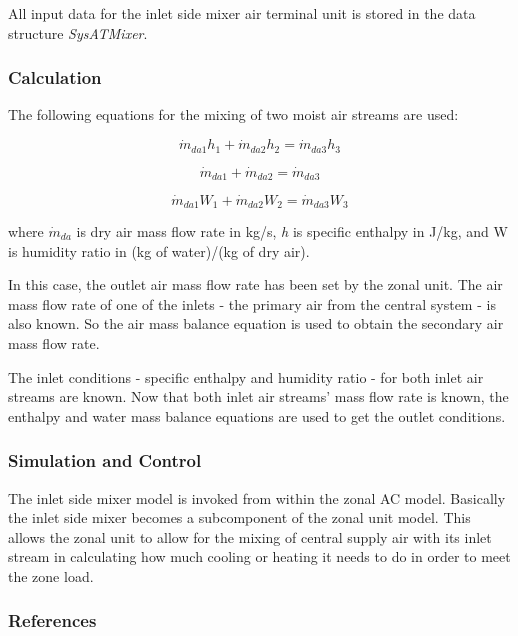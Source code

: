 All input data for the inlet side mixer air terminal unit is stored in the data structure \emph{SysATMixer}.

\subsubsection{Calculation}\label{calculation-1-000}

The following equations for the mixing of two moist air streams are used:

\begin{equation}
{\dot m_{da1}}{h_1} + {\dot m_{da2}}{h_2} = {\dot m_{da3}}{h_3}
\end{equation}

\begin{equation}
{\dot m_{da1}} + {\dot m_{da2}} = {\dot m_{da3}}
\end{equation}

\begin{equation}
{\dot m_{da1}}{W_1} + {\dot m_{da2}}{W_2} = {\dot m_{da3}}{W_3}
\end{equation}

where \({\dot m_{da}}\) is dry air mass flow rate in kg/s, \emph{h} is specific enthalpy in J/kg, and W is humidity ratio in (kg of water)/(kg of dry air).

In this case, the outlet air mass flow rate has been set by the zonal unit. The air mass flow rate of one of the inlets - the primary air from the central system - is also known. So the air mass balance equation is used to obtain the secondary air mass flow rate.

The inlet conditions - specific enthalpy and humidity ratio - for both inlet air streams are known. Now that both inlet air streams' mass flow rate is known, the enthalpy and water mass balance equations are used to get the outlet conditions.

\subsubsection{Simulation and Control}\label{simulation-and-control-1-002}

The inlet side mixer model is invoked from within the zonal AC model. Basically the inlet side mixer becomes a subcomponent of the zonal unit model. This allows the zonal unit to allow for the mixing of central supply air with its inlet stream in calculating how much cooling or heating it needs to do in order to meet the zone load.

\subsubsection{References}\label{references-1-020}

